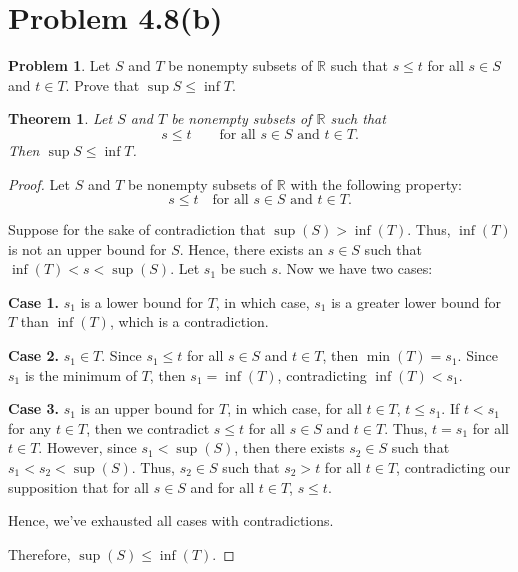 \documentclass{article}
\newtheorem{theorem}{Theorem}
\theoremstyle{definition}
\newtheorem*{problem}{Problem}
\begin{document}
\clearpage
\section{Problem 4.8(b)}

\begin{problem}
Let $S$ and $T$ be nonempty subsets of $\mathbb{R}$ such that $s\leq t$ for all $s\in S$ and $t\in T$. Prove that $\sup S\leq\inf T$.
\end{problem}

\begin{theorem}
Let \(S\) and \(T\) be nonempty subsets of \(\mathbb{R}\) such that
\[
s\leq t
\qquad\text{for all }s\in S\text{ and }t\in T.
\]
Then \(\sup S\leq\inf T\).
\end{theorem}

\begin{proof}
Let \(S\) and \(T\) be nonempty subsets of \(\mathbb{R}\) with the following property:
\[
s\leq t \quad\text{for all }s\in S\text{ and }t\in T.
\]

Suppose for the sake of contradiction that \(\sup(S)>\inf(T)\).
Thus, \(\inf(T)\) is not an upper bound for \(S\).
Hence, there exists an \(s\in S\) such that \(\inf(T)<s<\sup(S)\).
Let \(s_1\) be such \(s\).
Now we have two cases:

\textbf{Case 1.} \(s_1\) is a lower bound for \(T\), in which case, \(s_1\) is a greater lower bound for \(T\) than \(\inf(T)\), which is a contradiction.

\textbf{Case 2.} \(s_1\in T\).
Since \(s_1\leq t\) for all \(s\in S\) and \(t\in T\), then \(\min(T)=s_1\).
Since \(s_1\) is the minimum of \(T\), then \(s_1=\inf(T)\), contradicting \(\inf(T)<s_1\).

\textbf{Case 3.} \(s_1\) is an upper bound for \(T\), in which case, for all \(t\in T\), \(t\leq s_1\).
If \(t<s_1\) for any \(t\in T\), then we contradict \(s\leq t\) for all \(s\in S\) and \(t\in T\).
Thus, \(t=s_1\) for all \(t\in T\).
However, since \(s_1<\sup(S)\), then there exists \(s_2\in S\) such that \(s_1<s_2<\sup(S)\).
Thus, \(s_2\in S\) such that \(s_2>t\) for all \(t\in T\), contradicting our supposition that for all \(s\in S\) and for all \(t\in T\), \(s\leq t\).

Hence, we've exhausted all cases with contradictions.

Therefore, \(\sup(S)\leq\inf(T)\).
\end{proof}
\end{document}
